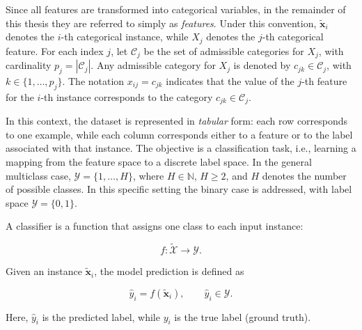 Since all features are transformed into categorical variables, in the remainder of this thesis they are referred to simply as \emph{features}. Under this convention, $\tilde{\mathbf{x}}_i$ denotes the $i$-th categorical instance, while $X_j$ denotes the $j$-th categorical feature. For each index $j$, let $\mathcal{C}_j$ be the set of admissible categories for $X_j$, with cardinality $p_j = |\mathcal{C}_j|$. Any admissible category for $X_j$ is denoted by $c_{jk} \in \mathcal{C}_j$, with $k \in \{1, \ldots, p_j\}$. The notation $x_{ij} = c_{jk}$ indicates that the value of the $j$-th feature for the $i$-th instance corresponds to the category $c_{jk} \in \mathcal{C}_j$.

In this context, the dataset is represented in \emph{tabular} form: each row corresponds to one example, while each column corresponds either to a feature or to the label associated with that instance. The objective is a classification task, i.e., learning a mapping from the feature space to a discrete label space. In the general multiclass case, $\mathcal{Y} = \{1,\dots,H\}$, where $H \in \mathbb{N}$, $H \geq 2$, and $H$ denotes the number of possible classes. In this specific setting the binary case is addressed, with label space $\mathcal{Y} = \{0,1\}$.

A classifier is a function that assigns one class to each input instance:

\begin{equation}
  f: \widetilde{\mathcal{X}} \rightarrow \mathcal{Y}.
\end{equation}

Given an instance $\tilde{\mathbf{x}}_i$, the model prediction is defined as

\begin{equation}
  \hat{y}_i = f(\tilde{\mathbf{x}}_i), \qquad \hat{y}_i \in \mathcal{Y}.
\end{equation}

Here, $\hat{y}_i$ is the predicted label, while $y_i$ is the true label (ground truth).

